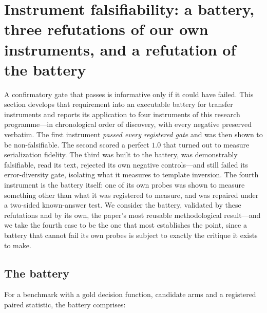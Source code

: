 \section{Instrument falsifiability: a battery, three refutations of our own instruments, and a refutation of the battery}
\label{sec:falsifiability}

A confirmatory gate that passes is informative only if it could have failed. This section develops that requirement into an executable battery for transfer instruments and reports its application to four instruments of this research programme---in chronological order of discovery, with every negative preserved verbatim. The first instrument \emph{passed every registered gate} and was then shown to be non-falsifiable. The second scored a perfect $1.0$ that turned out to measure serialization fidelity. The third was built to the battery, was demonstrably falsifiable, read its text, rejected its own negative controls---and still failed its error-diversity gate, isolating what it measures to template inversion. The fourth instrument is the battery itself: one of its own probes was shown to measure something other than what it was registered to measure, and was repaired under a two-sided known-answer test. We consider the battery, validated by these refutations and by its own, the paper's most reusable methodological result---and we take the fourth case to be the one that most establishes the point, since a battery that cannot fail its own probes is subject to exactly the critique it exists to make.

\subsection{The battery}
\label{sec:battery}

For a benchmark with a gold decision function, candidate arms and a registered paired statistic, the battery comprises:

